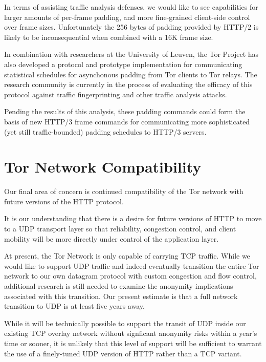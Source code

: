\documentclass[letterpaper,11pt]{llncs}
\begin{document}
In terms of assisting traffic analysis defenses, we would like to see
capabilities for larger amounts of per-frame padding, and more fine-grained
client-side control over frame sizes. Unfortunately the 256 bytes of padding
provided by HTTP/2 is likely to be inconsequential when combined with a 16K
frame size.

In combination with researchers at the University of Leuven, the Tor Project
has also developed a protocol and prototype implementation for communicating
statistical schedules for asynchonous padding from Tor clients to Tor relays.
The research community is currently in the process of evaluating the efficacy
of this protocol against traffic fingerprinting and other traffic analysis
attacks.

Pending the results of this analysis, these padding commands could form the
basis of new HTTP/3 frame commands for communicating more sophisticated (yet
still traffic-bounded) padding schedules to HTTP/3 servers.


\section{Tor Network Compatibility}

Our final area of concern is continued compatibility of the Tor network with
future versions of the HTTP protocol.

It is our understanding that there is a desire for future versions of HTTP to
move to a UDP transport layer so that reliability, congestion control, and
client mobility will be more directly under control of the application layer.

At present, the Tor Network is only capable of carrying TCP traffic. While we
would like to support UDP traffic and indeed eventually transition the entire
Tor network to our own datagram protocol with custom congestion and flow
control, additional research is still needed to examine the anonymity
implications associated with this transition. Our present estimate is that a
full network transition to UDP is at least five years away.


While it will be technically possible to support the transit of UDP inside our
existing TCP overlay network without signficant anonymity risks within a
year's time or sooner, it is unlikely that this level of support will be
sufficient to warrant the use of a finely-tuned UDP version of HTTP rather
than a TCP variant.
\end{document}
